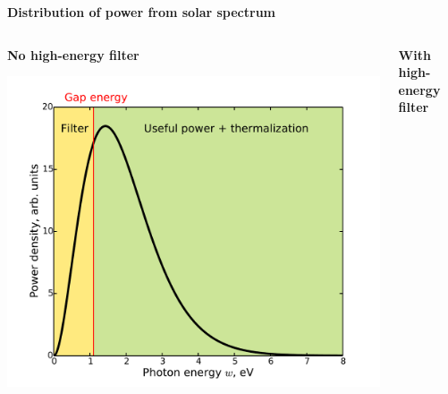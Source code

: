 \documentclass{beamer}
\begin{document}
\begin{frame}
\vspace{-0.2cm}
\begin{center}
    \textbf{\Large Distribution of power from solar spectrum}
\end{center}

\vspace{-0.6cm}

\begin{columns}

\begin{column}{0.45\textwidth}
 \begin{center}
    \textbf{No high-energy filter}

  \includegraphics[width=1.0\textwidth]{figures/solar_spectrum/Planck-spectrum1.pdf} 
 \end{center}
\end{column}

\begin{column}{0.45\textwidth}

 \begin{center}
    \textbf{With high-energy filter}


\end{center}
\end{column}
\end{columns}
\end{frame}
\end{document}

